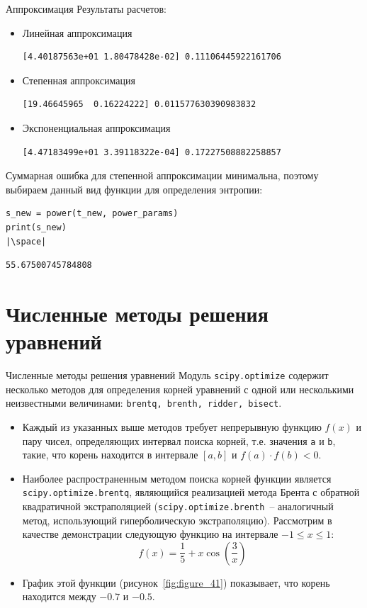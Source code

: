 \documentclass[aspectratio=169, mathserif]{beamer}	%
\begin{document}
\begin{frame}[fragile]{Аппроксимация}
\scriptsize
Результаты расчетов:
\begin{itemize}
\item Линейная аппроксимация
\begin{verbatim}
[4.40187563e+01 1.80478428e-02] 0.11106445922161706
\end{verbatim}
\item Степенная аппроксимация
\begin{verbatim}
[19.46645965  0.16224222] 0.011577630390983832
\end{verbatim}
\item Экспоненциальная аппроксимация
\begin{verbatim}
[4.47183499e+01 3.39118322e-04] 0.17227508882258857
\end{verbatim}
\end{itemize}
\vfill
Суммарная ошибка для степенной аппроксимации минимальна, поэтому выбираем данный вид функции для определения энтропии:
\vfill
\begin{verbatim}
s_new = power(t_new, power_params)
print(s_new)
|\space|
\end{verbatim}
\begin{verbatim}
55.67500745784808
\end{verbatim}
\vfill
\end{frame}

\section{Численные методы решения уравнений}
\sectionframe

\begin{frame}[fragile, label=c]{Численные методы решения уравнений}
\scriptsize
Модуль \texttt{scipy.optimize} содержит несколько методов для определения корней уравнений с одной или несколькими неизвестными величинами: \texttt{brentq, brenth, ridder, bisect}.
\vfill
\begin{itemize}
\item Каждый из указанных выше методов требует непрерывную функцию $f(x)$ и пару чисел, определяющих интервал поиска корней, т.е. значения \texttt{a} и \texttt{b}, такие, что корень находится в интервале $[a, b]$ и $f(a) \cdot f(b) < 0$.
\item Наиболее распространенным методом поиска корней функции является \texttt{scipy.optimize.brentq}, являющийся реализацией метода Брента с обратной квадратичной экстраполяцией (\texttt{scipy.optimize.brenth}~-- аналогичный метод, использующий гиперболическую экстраполяцию). Рассмотрим в качестве демонстрации следующую функцию на интервале ${-1 \leqslant x \leqslant 1}$:
\vfill
$$
	f(x) = \dfrac{1}{5} +  x\cos\left(\dfrac{3}{x}\right)
$$
\vfill
\item  График этой функции (рисунок~\ref{fig:figure_41}) показывает, что корень находится между $\mathrm{-}0.7$ и $\mathrm{-}0.5$.
\end{itemize}
\vfill
\end{frame}
\end{document}

